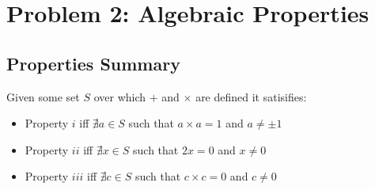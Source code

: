 \documentclass{article}
\begin{document}
  \section{Problem 2: Algebraic Properties}
  \subsection{Properties Summary}
  Given some set $S$ over which $+$ and $\times$ are defined it satisifies:
  \begin{itemize}
  \item Property $i$ iff $\nexists a \in S$ such that $a \times a = 1$ and $a \neq \pm 1$
  \item Property $ii$ iff $\nexists x \in S$ such that $2x = 0$ and $x \neq 0$
  \item Property $iii$ iff $\nexists c \in S$ such that $c \times c = 0$ and $c \neq 0$
  \end{itemize}
\end{document}
